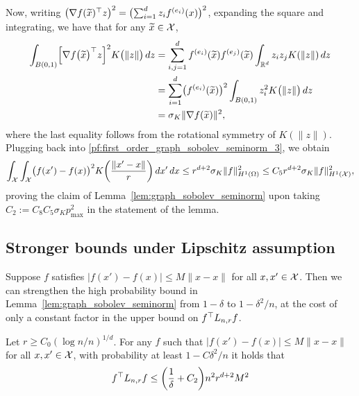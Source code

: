 Now, writing $\bigl(\nabla f(\widetilde{x}) ^{\top} z\bigr)^2 = \bigl(\sum_{i = 1}^{d} z_{i} f^{(e_i)}(x) \bigr)^2$, expanding the square and integrating, we have that for any $\widetilde{x} \in \mathcal{X}$,
\begin{align*}
\int_{B(0,1)} \Bigl[\nabla f\bigl(\widetilde{x}\bigr)^{\top} z\Bigr]^2 K\bigl(\|z\|\bigr) \,dz & = \sum_{i,j = 1}^{d} f^{(e_i)}(\widetilde{x}) f^{(e_j)}(\widetilde{x}) \int_{\mathbb{R}^d} z_iz_jK(\|z\|) \,dz \\
& = \sum_{i = 1}^{d} \bigl(f^{(e_i)}(\widetilde{x})\bigr)^2 \int_{B(0,1)} z_i^2 K\bigl(\|z\|\bigr) \,dz \\
& = \sigma_K \|\nabla f(\widetilde{x})\|^2,
\end{align*}
where the last equality follows from the rotational symmetry of $K(\|z\|)$. Plugging back into \eqref{pf:first_order_graph_sobolev_seminorm_3}, we obtain
\begin{equation*}
\int_{\mathcal{X}} \int_{\mathcal{X}} \bigl(f(x') - f(x)\bigr)^2 K\biggl(\frac{\|x' - x\|}{r}\biggr) \,dx' \,dx \leq r^{d + 2} \sigma_K \|f\|_{H^1(\Omega)}^2 \leq C_5 r^{d + 2} \sigma_K \|f\|_{H^1(\mathcal{X})}^2,
\end{equation*}
proving the claim of Lemma~\ref{lem:graph_sobolev_seminorm} upon taking $C_2 := C_8C_5 \sigma_K p_{\max}^2$ in the statement of the lemma.

\subsection{Stronger bounds under Lipschitz assumption}

Suppose $f$ satisfies $|f(x') - f(x)| \leq M \|x - x\|$ for all $x,x' \in \mathcal{X}$. Then we can strengthen the high probability bound in Lemma~\ref{lem:graph_sobolev_seminorm} from $1 - \delta$ to $1 - \delta^2/n$, at the cost of only a constant factor in the upper bound on $f^{\top} L_{n,r} f$.
\begin{proposition}
	\label{prop:graph_sobolev_seminorm_lipschitz}
	Let $r \geq C_0(\log n/n)^{1/d}$. For any $f$ such that $|f(x') - f(x)| \leq M \|x - x\|$ for all $x,x' \in \mathcal{X}$, with probability at least $1 - C\delta^2/n$ it holds that
	\begin{equation*}
	f^{\top} L_{n,r} f \leq \biggl(\frac{1}{\delta} + C_2\biggr) n^2 r^{d + 2} M^2
	\end{equation*}
\end{proposition}


